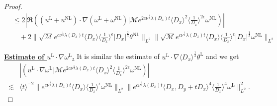 \documentclass[reqno, 12pt]{amsart} %
\theoremstyle{plain} %
\theoremstyle{definition}
\theoremstyle{remark}
\numberwithin{equation}{section} %
\begin{document}
\begin{proof}
\begin{align*}
			& \leq 2\left|\Re\left((u^{\mathrm{L}}+u^{\mathrm{NL}}) \cdot \nabla(\omega^{\mathrm{L}}+\omega^{\mathrm{NL}})  \big| \mathcal{M} e^{2 c \nu^{\frac{1}{3}} \lambda\left(D_x\right) t}\langle D_x\rangle^2\langle\frac{1}{D_x}\rangle^{2 \epsilon}  \omega^{\mathrm{NL}} \right)\right| \\
			&\quad  + 2 \| \sqrt{\mathcal{M}} e^{c \nu^{\frac{1}{3}} \lambda\left(D_x\right) t}\langle D_x\rangle\langle\frac{1}{D_x}\rangle^\epsilon |D_x|^\frac23 \theta^{\mathrm{NL}}  \|_{L^2}  \| \sqrt{\mathcal{M}} e^{c \nu^{\frac{1}{3}} \lambda\left(D_x\right) t}\langle D_x\rangle\langle\frac{1}{D_x}\rangle^\epsilon |D_x|^\frac13 \omega^{\mathrm{NL}} \|_{L^2} 
		\end{align*}
		
		\underline{\bf Estimate of  $u^{\mathrm{L}} \cdot  \nabla \omega^{\mathrm{L}}$.} It is similar the estimate of  $u^{\mathrm{L}} \cdot  \nabla \langle D_x \rangle^\frac13 \theta^{\mathrm{L}}$ and we get
		\begin{equation*}\begin{aligned} \label{eq:sum11}
				&\left|\left(u^{\mathrm{L}} \cdot \nabla \omega^{\mathrm{L}} \big| \mathcal{M} e^{2 c \nu^{\frac{1}{3}} \lambda\left(D_x\right) t}\langle D_x\rangle^2\langle\frac{1}{D_x}\rangle^{2 \epsilon} \omega^{\mathrm{NL}} \right)\right| \\
				\lesssim	& \langle t\rangle^{-2} \|e^{c \nu^{\frac{1}{3}} \lambda\left(D_x\right) t}\langle D_x\rangle  \langle \frac{1}{D_x}\rangle^\epsilon \omega^{\mathrm{NL}}\|_{L^2}    \|e^{c \nu^{\frac{1}{3}} \lambda\left(D_x\right) t}\langle D_x, D_y + tD_x\rangle^4\langle\frac{1}{D_x}\rangle^4 \omega^{\mathrm{L}} \|_{L^2}^2.
		\end{aligned}\end{equation*}
		

\end{proof}
\end{document}

